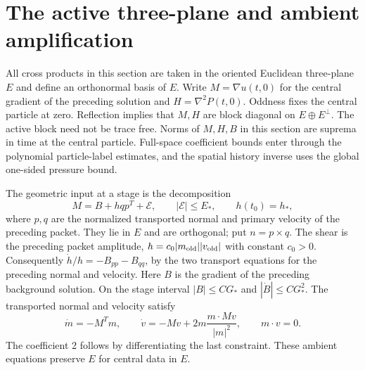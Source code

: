\documentclass[11pt]{article}
\theoremstyle{definition}
\begin{document}
\section{The active three-plane and ambient amplification}
All cross products in this section are taken in the oriented Euclidean
three-plane $E$ and define an orthonormal basis of $E$. Write
$M=\nabla u(t,0)$ for the central gradient of the preceding solution and
$H=\nabla^2P(t,0)$. Oddness fixes the central
particle at zero. Reflection implies that $M,H$ are block diagonal on $E\oplus E^\perp$.
The active block need not be trace free. Norms of $M,H,B$ in this section are suprema in time at the central
particle. Full-space coefficient bounds enter through the polynomial
particle-label estimates, and the spatial history inverse uses the global
one-sided pressure bound.

The geometric input at a stage is the decomposition
\begin{equation}\label{eq:central-decomposition}
 M=B+hqp^T+\mathcal E,\qquad |\mathcal E|\leq E_*,\qquad h(t_0)=h_*,
\end{equation}
where $p,q$ are the normalized transported normal and primary velocity of
the preceding packet. They lie in $E$ and are orthogonal; put $n=p\times q$.
The shear is the preceding packet amplitude,
$h=c_0|m_{\rm old}||v_{\rm old}|$ with constant $c_0>0$.
Consequently $\dot h/h=-B_{pp}-B_{qq}$, by the two transport equations
for the preceding normal and velocity.
Here $B$ is the gradient of the preceding background solution.
On the stage interval $|B|\leq C G_*$ and $|\dot B|\leq C G_*^2$.
The transported normal and velocity satisfy
\begin{equation}\label{eq:ray-velocity}
 \dot m=-M^Tm,\qquad
 \dot v=-Mv+2m\frac{m\cdot Mv}{|m|^2},\qquad m\cdot v=0.
\end{equation}
The coefficient 2 follows by differentiating the last constraint. These
ambient equations preserve $E$ for central data in $E$.
\end{document}
